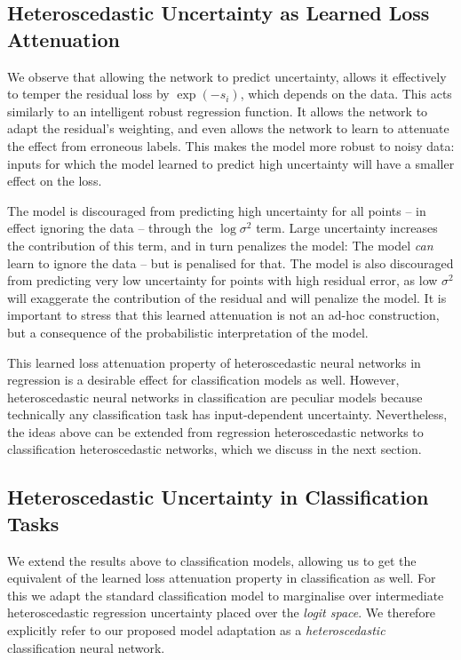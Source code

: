 \subsection{Heteroscedastic Uncertainty as Learned Loss Attenuation}

We observe that allowing the network to predict uncertainty, allows it effectively to temper the residual loss by $\exp(-s_i)$, which depends on the data. This acts similarly to an intelligent robust regression function. It allows the network to adapt the residual's weighting, and even allows the network to learn to attenuate the effect from erroneous labels. This makes the model more robust to noisy data: inputs for which the model learned to predict high uncertainty will have a smaller effect on the loss.

The model is discouraged from predicting high uncertainty for all points -- in effect ignoring the data -- through the $\log \sigma^2$ term. Large uncertainty increases the contribution of this term, and in turn penalizes the model: The model \textit{can} learn to ignore the data -- but is penalised for that. The model is also discouraged from predicting very low uncertainty for points with high residual error, as low $\sigma^2$ will exaggerate the contribution of the residual and will penalize the model. It is important to stress that this learned attenuation is not an ad-hoc construction, but a consequence of the probabilistic interpretation of the model. 

This learned loss attenuation property of heteroscedastic neural networks in regression is a desirable effect for classification models as well. 
However, heteroscedastic neural networks in classification are peculiar models because technically any classification task has input-dependent uncertainty. Nevertheless, the ideas above can be extended from regression heteroscedastic networks to classification heteroscedastic networks, which we discuss in the next section.


\subsection{Heteroscedastic Uncertainty in Classification Tasks}

We extend the results above to classification models, allowing us to get the equivalent of the learned loss attenuation property in classification as well.
For this we adapt the standard classification model to marginalise over intermediate heteroscedastic regression uncertainty placed over the \textit{logit space}.
We therefore explicitly refer to our proposed model adaptation as a \textit{heteroscedastic} classification neural network.

